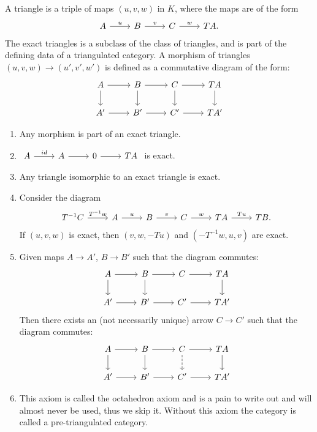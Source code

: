 \documentclass[a4paper, UKenglish]{report}
\begin{document}
A triangle is a triple of maps $(u, v, w)$ in $K$, where the maps are of the form 
\[
    \begin{tikzcd} 
        A \arrow[r, "u"] & B \arrow[r, "v"] & C \arrow[r, "w"] & TA. 
    \end{tikzcd}
\]
The exact triangles is a subclass of the class of triangles, and is part of the defining data of a triangulated category.
A morphism of triangles $(u, v, w) \to (u', v', w')$ is defined as a commutative diagram of the form:
\[
    \begin{tikzcd}
        A \ar{d} \ar{r} & B \ar{d} \ar{r} & C \ar{d} \ar{r} & \ar{d} TA \\
        A' \ar{r} & B' \ar{r} & C' \ar{r} & TA' 
    \end{tikzcd} 
\]
\begin{enumerate}
    \item Any morphism is part of an exact triangle.
    
    \item $\begin{tikzcd} A \arrow[r, "id"] & A \arrow[r] & 0 \arrow[r] & TA \end{tikzcd}$ is exact.
    
    \item Any triangle isomorphic to an exact triangle is exact.

    \item Consider the diagram 
    \[
        \begin{tikzcd}
            T^{-1}C \arrow[r, "T^{-1}w"] & A \arrow[r, "u"] & B \arrow[r, "v"] & C \arrow[r, "w"] & TA \arrow[r, "Tu"] & TB.
        \end{tikzcd}
    \] 
    If $(u,v,w)$ is exact, then $(v,w,-Tu)$ and $(-T^{-1}w,u,v)$ are exact.

    \item  Given maps $A \to A'$, $B \to B'$ such that the diagram commutes:
    \[
        \begin{tikzcd}
            A \ar{d} \ar{r} & B \ar{d} \ar{r} & C  \ar{r} & \ar{d} TA \\
            A' \ar{r} & B' \ar{r} & C' \ar{r} & TA' 
        \end{tikzcd}
    \]
Then there exists an (not necessarily unique) arrow $C \to C'$ such that the diagram commutes:
    \[
        \begin{tikzcd}
            A \ar{d} \ar{r} & B \ar{d} \ar{r} & C \arrow[dashed]{d} \ar{r} & \ar{d} TA \\
            A' \ar{r} & B' \ar{r} & C' \ar{r} & TA' 
        \end{tikzcd} 
    \]

    \item This axiom is called the octahedron axiom and is a pain to write out and will almost never be used, thus we skip it. Without this axiom the category is called a pre-triangulated category.
\end{enumerate}
\end{document}
